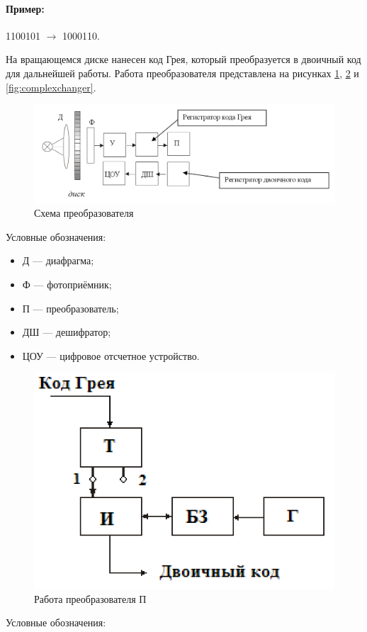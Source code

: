 \paragraph*{Пример:} 1100101 $\rightarrow$ 1000110.

На вращающемся диске нанесен код Грея, который преобразуется в двоичный код для дальнейшей работы. Работа преобразователя представлена на рисунках \ref{fig:commonchanger}, \ref{fig:changer} и \ref{fig:complexchanger}.

\begin{figure}[ht]
    \includegraphics[width=1\linewidth]{Figures/commonchanger.png}
    \caption{Схема преобразователя\label{fig:commonchanger}}
\end{figure}

Условные обозначения:

\begin{itemize}
    \item Д --- диафрагма;
    \item Ф --- фотоприёмник;
    \item П --- преобразователь;
    \item ДШ --- дешифратор;
    \item ЦОУ --- цифровое отсчетное устройство.
\end{itemize}

\begin{figure}[ht]
    \includegraphics[width=0.5\linewidth]{Figures/changer.png}
    \caption{Работа преобразователя П}
    \label{fig:changer}
\end{figure}

Условные обозначения:


